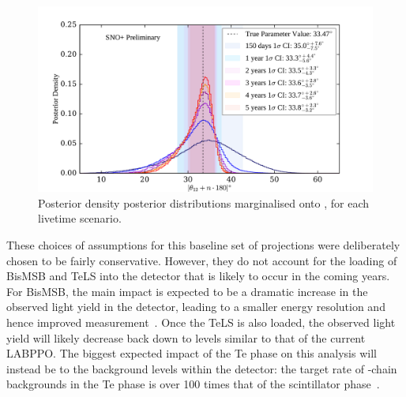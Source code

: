 \begin{figure}
    \centering
    \includegraphics[width=\textwidth]{6_SolarAnalysis/images/theta_12_comparison_projections.pdf}
    \caption[Posterior density posterior distributions marginalised onto \tonetwo{}, for each livetime scenario]
    {Posterior density posterior distributions marginalised onto \tonetwo{}, for each livetime scenario.}
    \label{fig:1d_posteriors_projections}
\end{figure}




These choices of assumptions for this baseline set of projections were deliberately chosen to be fairly conservative. However, they do not account for the loading of BisMSB and TeLS into the detector that is likely to occur in the coming years. For BisMSB, the main impact is expected to be a dramatic increase in the observed light yield in the detector, leading to a smaller energy resolution and hence improved measurement~\cite{}. %
Once the TeLS is also loaded, the observed light yield will likely decrease back down to levels similar to that of the current LABPPO. The biggest expected impact of the Te phase on this analysis will instead be to the background levels within the detector: the target rate of -chain backgrounds in the Te phase is over 100 times that of the scintillator phase~\cite{andringaCurrentStatusFuture2016}. %



